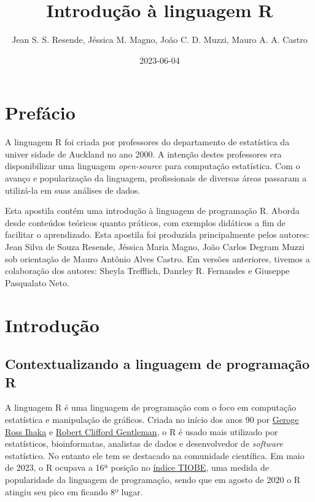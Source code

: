\documentclass[
]{book}
\title{Introdução à linguagem R}
\author{Jean S. S. Resende, Jéssica M. Magno, João C. D. Muzzi, Mauro A. A. Castro}
\date{2023-06-04}
\theoremstyle{definition}
\theoremstyle{definition}
\theoremstyle{definition}
\theoremstyle{definition}
\theoremstyle{remark}
\begin{document}
\maketitle

{
\setcounter{tocdepth}{1}
\tableofcontents
}
\hypertarget{prefuxe1cio}{%
\chapter{Prefácio}\label{prefuxe1cio}}

A linguagem R foi criada por professores do departamento de estatística da univer sidade de Auckland no ano 2000. A intenção destes professores era disponibilizar uma linguagem \emph{open-source} para computação estatística. Com o avanço e popularização da linguagem, profissionais de diversas áreas passaram a utilizá-la em suas análises de dados.

Esta apostila contém uma introdução à linguagem de programação R. Aborda desde conteúdos teóricos quanto práticos, com exemplos didáticos a fim de facilitar o aprendizado. Esta apostila foi produzida principalmente pelos autores: Jean Silva de Souza Resende, Jéssica Maria Magno, João Carlos Degram Muzzi sob orientação de Mauro Antônio Alves Castro. Em versões anteriores, tivemos a colaboração dos autores: Sheyla Trefflich, Danrley R. Fernandes e Giuseppe Pasqualato Neto.

\hypertarget{introduuxe7uxe3o}{%
\chapter{Introdução}\label{introduuxe7uxe3o}}

\hypertarget{contextualizando-a-linguagem-de-programauxe7uxe3o-r}{%
\section{Contextualizando a linguagem de programação R}\label{contextualizando-a-linguagem-de-programauxe7uxe3o-r}}

A linguagem R é uma linguagem de programação com o foco em computação estatística e manipulação de gráficos. Criada no início dos anos 90 por \href{https://en.wikipedia.org/wiki/Ross_Ihaka}{Geroge Ross Ihaka} e \href{https://en.wikipedia.org/wiki/Robert_Gentleman_(statistician)}{Robert Clifford Gentleman}, o R é usado mais utilizado por estatísticos, bioinformatas, analistas de dados e desenvolvedor de \emph{software} estatístico. No entanto ele tem se destacado na comunidade científica. Em maio de 2023, o R ocupava a 16ª posição no \href{https://www.tiobe.com/tiobe-index/}{índice TIOBE}, uma medida de popularidade da linguagem de programação, sendo que em agosto de 2020 o R atingiu seu pico em ficando 8º lugar.
\end{document}
